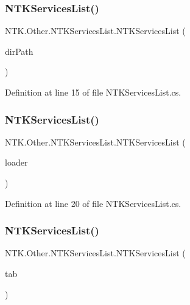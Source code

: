 \subsubsection{\texorpdfstring{NTKServicesList()}{NTKServicesList()}\hspace{0.1cm}{\footnotesize\ttfamily [1/3]}}
{\footnotesize\ttfamily N\+T\+K.\+Other.\+N\+T\+K\+Services\+List.\+N\+T\+K\+Services\+List (\begin{DoxyParamCaption}\item[{String}]{dir\+Path }\end{DoxyParamCaption})}



Definition at line 15 of file N\+T\+K\+Services\+List.\+cs.

\mbox{\label{class_n_t_k_1_1_other_1_1_n_t_k_services_list_acf41b42b6b534cc9198149ae1febbf55}} 
\subsubsection{\texorpdfstring{NTKServicesList()}{NTKServicesList()}\hspace{0.1cm}{\footnotesize\ttfamily [2/3]}}
{\footnotesize\ttfamily N\+T\+K.\+Other.\+N\+T\+K\+Services\+List.\+N\+T\+K\+Services\+List (\begin{DoxyParamCaption}\item[{\mbox{\hyperlink{class_n_t_k_1_1_i_o_1_1_dll_loader}{Dll\+Loader}}}]{loader }\end{DoxyParamCaption})}



Definition at line 20 of file N\+T\+K\+Services\+List.\+cs.

\mbox{\label{class_n_t_k_1_1_other_1_1_n_t_k_services_list_ae385c94ba1254b864139e79690016116}} 
\subsubsection{\texorpdfstring{NTKServicesList()}{NTKServicesList()}\hspace{0.1cm}{\footnotesize\ttfamily [3/3]}}
{\footnotesize\ttfamily N\+T\+K.\+Other.\+N\+T\+K\+Services\+List.\+N\+T\+K\+Services\+List (\begin{DoxyParamCaption}\item[{params \mbox{\hyperlink{class_n_t_k_1_1_service_1_1_n_t_k_service}{N\+T\+K\+Service}} \mbox{[}$\,$\mbox{]}}]{tab }\end{DoxyParamCaption})}



